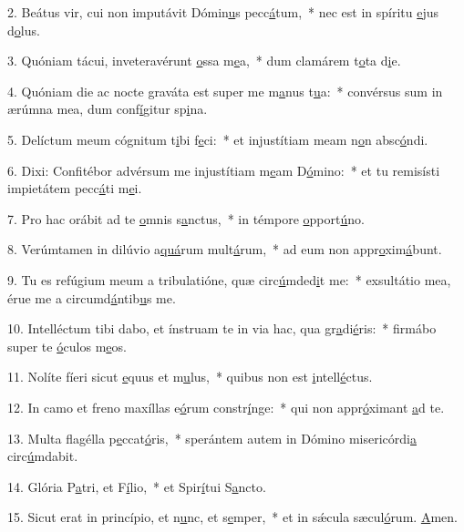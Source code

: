 2. Beátus vir, cui non imputávit Dómin\uline{u}s pecc\uline{á}tum,~* nec est in spíritu \uline{e}jus d\uline{o}lus.\par 
3. Quóniam tácui, inveteravérunt \uline{o}ssa m\uline{e}a,~* dum clamárem t\uline{o}ta d\uline{i}e.\par 
4. Quóniam die ac nocte graváta est super me m\uline{a}nus t\uline{u}a:~* convérsus sum in ærúmna mea, dum conf\uline{í}gitur sp\uline{i}na.\par 
5. Delíctum meum cógnitum t\uline{i}bi f\uline{e}ci:~* et injustítiam meam n\uline{o}n absc\uline{ó}ndi.\par 
6. Dixi: Confitébor advérsum me injustítiam m\uline{e}am D\uline{ó}mino:~* et tu remisísti impietátem pecc\uline{á}ti m\uline{e}i.\par 
7. Pro hac orábit ad te \uline{o}mnis s\uline{a}nctus,~* in témpore \uline{o}pport\uline{ú}no.\par 
8. Verúmtamen in dilúvio a\uline{quá}rum mult\uline{á}rum,~* ad eum non appr\uline{o}xim\uline{á}bunt.\par 
9. Tu es refúgium meum a tribulatióne, quæ circ\uline{ú}mded\uline{i}t me:~* exsultátio mea, érue me a circumd\uline{á}ntib\uline{u}s me.\par 
10. Intelléctum tibi dabo, et ínstruam te in via hac, qua gr\uline{a}di\uline{é}ris:~* firmábo super te \uline{ó}culos m\uline{e}os.\par 
11. Nolíte fíeri sicut \uline{e}quus et m\uline{u}lus,~* quibus non est \uline{i}ntell\uline{é}ctus.\par 
12. In camo et freno maxíllas e\uline{ó}rum constr\uline{í}nge:~* qui non appr\uline{ó}ximant \uline{a}d te.\par 
13. Multa flagélla p\uline{e}ccat\uline{ó}ris,~* sperántem autem in Dómino misericórdi\uline{a} circ\uline{ú}mdabit.\par 
14. Glória P\uline{a}tri, et F\uline{í}lio,~* et Spir\uline{í}tui S\uline{a}ncto.\par 
15. Sicut erat in princípio, et n\uline{u}nc, et s\uline{e}mper,~* et in sǽcula sæcul\uline{ó}rum. \uline{A}men.\par 

